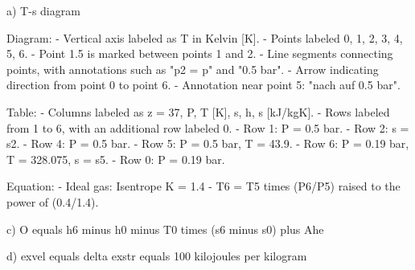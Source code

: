 a) T-s diagram

Diagram:
- Vertical axis labeled as T in Kelvin [K].
- Points labeled 0, 1, 2, 3, 4, 5, 6. 
- Point 1.5 is marked between points 1 and 2.
- Line segments connecting points, with annotations such as "p2 = p" and "0.5 bar".
- Arrow indicating direction from point 0 to point 6.
- Annotation near point 5: "nach auf 0.5 bar".

Table:
- Columns labeled as z = 37, P, T [K], s, h, s [kJ/kgK].
- Rows labeled from 1 to 6, with an additional row labeled 0.
- Row 1: P = 0.5 bar.
- Row 2: s = s2.
- Row 4: P = 0.5 bar.
- Row 5: P = 0.5 bar, T = 43.9.
- Row 6: P = 0.19 bar, T = 328.075, s = s5.
- Row 0: P = 0.19 bar.

Equation:
- Ideal gas: Isentrope K = 1.4
- T6 = T5 times (P6/P5) raised to the power of (0.4/1.4).

c) O equals h6 minus h0 minus T0 times (s6 minus s0) plus Ahe

d) exvel equals delta exstr equals 100 kilojoules per kilogram